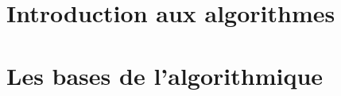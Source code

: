 \documentclass[a4paper,doubleside,12pt]{book}
\begin{document}

	
	
	

	\part{Introduction aux algorithmes}	
%		

	\part{Les bases de l'algorithmique}

			


	
	
\end{document}
